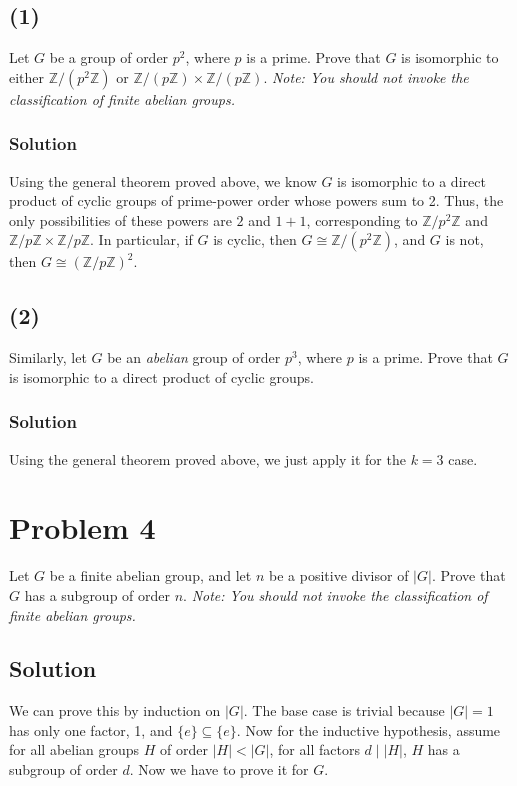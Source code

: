 \documentclass[fleqn]{article}
\begin{document}
        \pagebreak
        
        \subsection{(1)}
        Let $G$ be a group of order $p^2$, where $p$ is a prime.  Prove that $G$ is isomorphic to either $\mathbb{Z}/(p^2\mathbb{Z})$ or $\mathbb{Z}/(p\mathbb{Z}) \times \mathbb{Z}/(p\mathbb{Z})$.  \textit{Note: You should not invoke the classification of finite abelian groups.}
            
            \subsubsection{Solution}
            Using the general theorem proved above, we know $G$ is isomorphic to a direct product of cyclic groups of prime-power order whose powers sum to 2.  Thus, the only possibilities of these powers are $2$ and $1 + 1$, corresponding to $\mathbb{Z}/p^2\mathbb{Z}$ and $\mathbb{Z}/p\mathbb{Z} \times \mathbb{Z}/p\mathbb{Z}$.  In particular, if $G$ is cyclic, then $G \cong \mathbb{Z}/(p^2\mathbb{Z})$, and $G$ is not, then $G \cong (\mathbb{Z}/p\mathbb{Z})^2$.
        
        \subsection{(2)}
        Similarly, let $G$ be an \textit{abelian} group of order $p^3$, where $p$ is a prime.  Prove that $G$ is isomorphic to a direct product of cyclic groups.
        
            \subsubsection{Solution}
            Using the general theorem proved above, we just apply it for the $k = 3$ case.
    
    \section{Problem 4}
    Let $G$ be a finite abelian group, and let $n$ be a positive divisor of $|G|$.  Prove that $G$ has a subgroup of order $n$.  \textit{Note: You should not invoke the classification of finite abelian groups.}
        
        \subsection{Solution}
        We can prove this by induction on $|G|$.  The base case is trivial because $|G| = 1$ has only one factor, 1, and $\{e\} \subseteq \{e\}$.  Now for the inductive hypothesis, assume for all abelian groups $H$ of order $|H| < |G|$, for all factors $d \mid |H|$, $H$ has a subgroup of order $d$.  Now we have to prove it for $G$.
        
\end{document}
